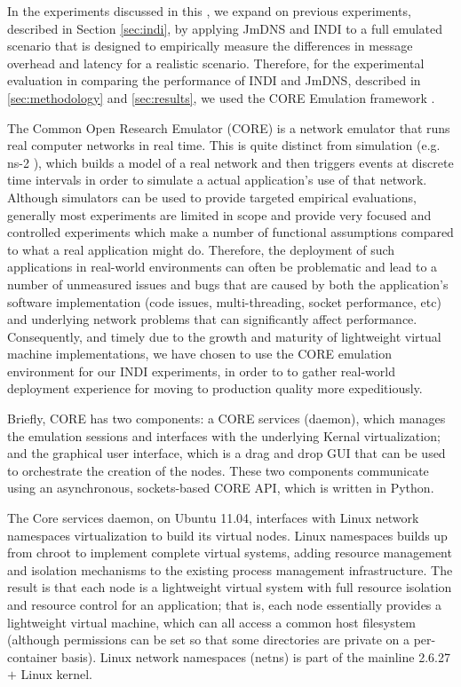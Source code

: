 In the experiments discussed in this \doctype, we expand on previous experiments, described in Section \ref{sec:indi}, by applying JmDNS and INDI to a full emulated scenario that is designed to empirically measure the differences in message overhead and latency for a realistic scenario.  Therefore, for the experimental evaluation in comparing the performance of INDI and JmDNS, described in \ref{sec:methodology} and \ref{sec:results}, we used the CORE Emulation framework \cite{ahrenholz2008core}. 

The Common Open Research Emulator (CORE)  is a network emulator that runs real computer networks in real time.  This is quite distinct from  simulation (e.g. ns-2 \cite{NS2_webpage}), which builds a model of a real network and then triggers events at discrete time intervals in order to simulate a actual application's use of that network.    Although simulators can be used to provide targeted empirical evaluations, generally most experiments are limited in scope and provide very focused and controlled experiments which make a number of functional assumptions compared to what a real application might do.   Therefore, the deployment of such applications in real-world environments can often be problematic and lead to a number of unmeasured issues and bugs that are caused by both the application's software implementation (code issues, multi-threading, socket performance, etc) and underlying network problems that can significantly affect performance.  Consequently, and timely due to the growth and maturity of lightweight virtual machine implementations, we have chosen to use the CORE emulation environment for our INDI experiments, in order to to gather real-world deployment experience for moving to production quality more expeditiously. 

Briefly, CORE has two components:  a CORE services (daemon), which manages the emulation sessions and interfaces with the underlying Kernal virtualization; and the graphical user interface, which is a drag and drop GUI that can be used to orchestrate the creation of the nodes. These two components communicate using an asynchronous, sockets-based CORE API, which is written in Python. 

The Core services daemon, on Ubuntu 11.04, interfaces with Linux network namespaces virtualization to build its virtual nodes. Linux namespaces builds up from chroot to implement complete virtual systems, adding resource management and isolation mechanisms to the existing process management infrastructure.  The result is that each node is a lightweight virtual system with full resource isolation and resource control for an application; that is, each node essentially provides a lightweight virtual machine, which can all access a common host filesystem (although permissions can be set so that some directories are private on a per-container basis).  Linux network namespaces (netns) is part of the mainline 2.6.27$+$ Linux kernel.
 
